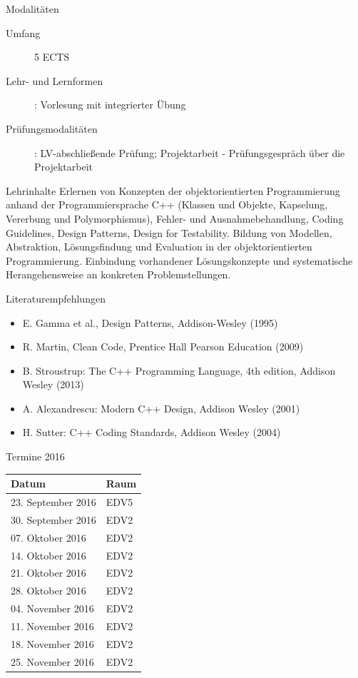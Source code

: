 \documentclass{beamer}
\begin{document}
\begin{frame}{Modalitäten}
\begin{description}
\item[Umfang] 5 ECTS
\item[Lehr- und Lernformen]: Vorlesung mit integrierter Übung
\item[Prüfungsmodalitäten]: LV-abschließende Prüfung; Projektarbeit - Prüfungsgespräch über die Projektarbeit
\end{description}
\end{frame}

\begin{frame}{Lehrinhalte}
Erlernen von Konzepten der objektorientierten Programmierung anhand der
Programmiersprache C++ (Klassen und Objekte, Kapselung, Vererbung und
Polymorphismus), Fehler- und Ausnahmebehandlung, Coding Guidelines, Design
Patterns, Design for Testability. Bildung von Modellen, Abstraktion,
Lösungsfindung und Evaluation in der  objektorientierten Programmierung.
Einbindung vorhandener Lösungskonzepte und systematische Herangehensweise an
konkreten Problemstellungen.
\end{frame}

\begin{frame}{Literaturempfehlungen}
\begin{itemize}
\item E. Gamma et al., Design Patterns, Addison-Wesley (1995)
\item R. Martin, Clean Code, Prentice Hall Pearson Education (2009)
\item B. Stroustrup: The C++ Programming Language, 4th edition, Addison Wesley
(2013)
\item A. Alexandrescu: Modern C++ Design, Addison Wesley (2001)
\item H. Sutter: C++ Coding Standards, Addison Wesley (2004)
\end{itemize}
\end{frame}

\begin{frame}{Termine 2016}
\begin{table}
\begin{tabular}{l | l }
Datum & Raum \\
\hline
23. September 2016 & EDV5 \\
30. September 2016 & EDV2 \\
07. Oktober 2016 & EDV2 \\
14. Oktober 2016 & EDV2 \\
21. Oktober 2016 & EDV2 \\
28. Oktober 2016 & EDV2 \\
04. November 2016 & EDV2 \\
11. November 2016 & EDV2 \\
18. November 2016 & EDV2 \\
25. November 2016 & EDV2
\end{tabular}
\end{table}
\end{frame}
\end{document}
